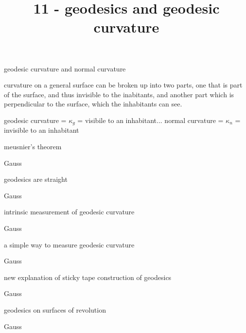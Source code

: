 \documentclass{article}
\title{11 - geodesics and geodesic curvature}
\newenvironment{andrew_section}[1]
    {
    \section{#1}
    \begin{itemize}
    }
    {
    \end{itemize}
    }
\begin{document}
\maketitle

\begin{andrew_section}{geodesic curvature and normal curvature}
    \item 
        curvature on a general surface can be broken up into two
        parts, one that is part of the surface, and thus invisible to
        the inabitants, and another part which is perpendicular to
        the surface, which the inhabitants can see.
    \item geodesic curvature  = $\kappa_g$ = visibile to an inhabitant... 
            normal curvature = $\kappa_n$ = invisible to an inhabitant
\end{andrew_section}

\begin{andrew_section}{meusnier's theorem}
    \item 
        Gauss
\end{andrew_section}

\begin{andrew_section}{geodesics are straight}
    \item 
        Gauss
\end{andrew_section}

\begin{andrew_section}{intrinsic measurement of geodesic curvature}
    \item 
        Gauss
\end{andrew_section}

\begin{andrew_section}{a simple way to measure geodesic curvature}
    \item 
        Gauss
\end{andrew_section}

\begin{andrew_section}{new explanation of sticky tape construction of geodesics}
    \item 
        Gauss
\end{andrew_section}

\begin{andrew_section}{geodesics on surfaces of revolution}
    \item 
        Gauss
\end{andrew_section}
\end{document}
